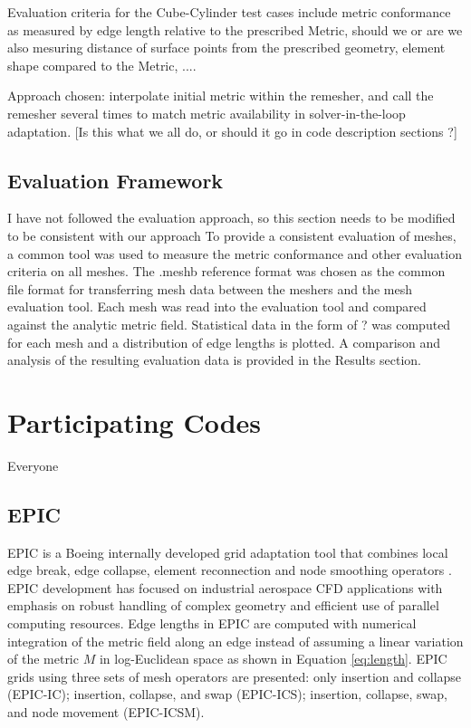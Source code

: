 \documentclass[3p,times,procedia,number]{elsarticle}
\begin{document}
Evaluation criteria for the Cube-Cylinder test cases include metric conformance as measured by edge length relative to the prescribed Metric,{\color{red} should we or are we also mesuring distance of surface points from the prescribed geometry, element shape compared to the Metric, ...}.

Approach chosen: interpolate initial metric within the remesher, and call the remesher several times to match metric availability in solver-in-the-loop adaptation. {\color{red}[Is this what we all do, or should it go in code description sections ?]}

\subsection{Evaluation Framework}

{\color {red} I have not followed the evaluation approach, so this section needs to be modified to be consistent with our approach}
To provide a consistent evaluation of meshes, a common tool was used to measure the metric conformance and other evaluation criteria on all meshes.   The .meshb {\color{red}reference} format was chosen as the common file format for transferring mesh data between the meshers and the mesh evaluation tool.  Each mesh was read into the evaluation tool and compared against the analytic metric field.   Statistical data in the form of {\color {red}?} was computed for each mesh and a distribution of edge lengths is plotted.   A comparison and analysis of the resulting evaluation data is provided in the Results section. 


\section{Participating Codes}
{\color{red} Everyone}

\subsection{EPIC}

EPIC is a Boeing internally developed grid adaptation tool that combines
local edge break, edge collapse, element reconnection and node smoothing
operators \cite{michal-krakos-aniso-adapt-edge}.
EPIC development has focused on industrial aerospace CFD
applications with emphasis on robust handling of complex geometry and
efficient use of parallel computing resources. Edge lengths in EPIC are
computed with numerical integration of the metric field along an edge
instead of assuming a linear variation of the metric $M$ in log-Euclidean space
as shown in Equation \ref{eq:length}.
EPIC grids using three sets of mesh operators are presented:
only insertion and collapse (EPIC-IC); insertion, collapse, and swap (EPIC-ICS);
insertion, collapse, swap, and node movement (EPIC-ICSM).
\end{document}
